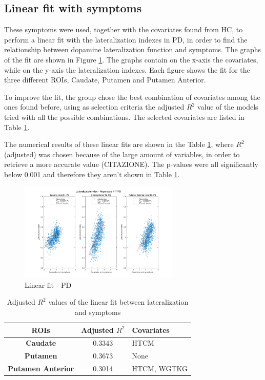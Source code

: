 \documentclass[]{article}
\begin{document}
\begin{multicols}{2}

\subsection{Linear fit with symptoms}

These symptoms were used, together with the covariates found from HC, to perform a linear fit with the lateralization indexes in PD, in order to find the relationship between dopamine lateralization function and symptoms. The graphs of the fit are shown in Figure \ref{fig:lin_fit_pd}. The graphs contain on the x-axis the covariates, while on the y-axis the lateralization indexes. Each figure shows the fit for the three different ROIs, Caudate, Putamen and Putamen Anterior. 

To improve the fit, the group chose the best combination of covariates among the ones found before, using as selection criteria the adjusted $R^2$ value of the models tried with all the possible combinations. The selected covariates are listed in Table \ref{tbl:R_squared_fit_pd}. 

The numerical results of these linear fits are shown in the Table \ref{tbl:R_squared_fit_pd}, where $R^2$ (adjusted) was chosen because of the large amount of variables, in order to retrieve a more accurate value (CITAZIONE). The p-values were all significantly below 0.001 and therefore they aren't shown in Table \ref{tbl:R_squared_fit_pd}.

\end{multicols}

\begin{figure}[h]
	\centering
	\includegraphics[width=3in]{../fit_covariates_pd}
	\caption{Linear fit - PD}
	\label{fig:lin_fit_pd}
\end{figure} 

\begin{table}[h]
	\centering
	\begin{tabular}{|c|c|l|}
		\hline
		\textbf{ROIs}             & \textbf{Adjusted $R^2$} & \textbf{Covariates} \\ \hline
		\textbf{Caudate}          & 0.3343                  & HTCM                \\ \hline
		\textbf{Putamen}          & 0.3673                  & None                \\ \hline
		\textbf{Putamen Anterior} & 0.3014                  & HTCM, WGTKG         \\ \hline
	\end{tabular}
	\caption{Adjusted $R^2$ values of the linear fit between lateralization and symptoms}
	\label{tbl:R_squared_fit_pd}
\end{table}
\end{document}
